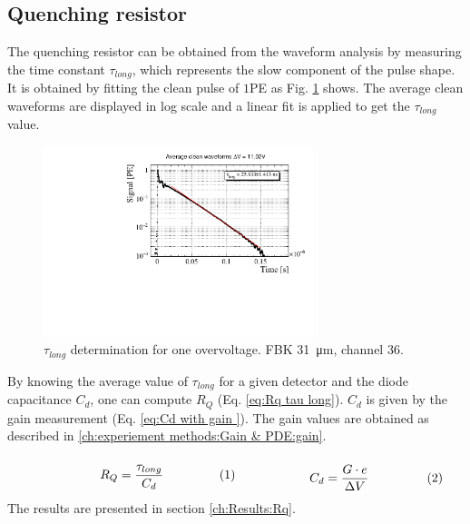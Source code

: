 \subsection{Quenching resistor} 
\label{ch:experiement methods:WA:Rq WA}
The quenching resistor can be obtained from the waveform analysis by measuring the time constant $\tau_{long}$, which represents the slow component of the pulse shape. It is obtained by fitting the clean pulse of $1$PE as Fig. \ref{fig:taulong fit} shows. The average clean waveforms are displayed in log scale and a linear fit is applied to get the $\tau_{long}$ value. 
\begin{figure}[hbtp]
    \centering
  \includegraphics[width=0.7\textwidth]{gfx/plots/WA/31/taulong.pdf}
    \caption{$\tau_{long}$ determination for one overvoltage. FBK \SI{31}{\micro m}, channel $36$.}
    \label{fig:taulong fit}
\end{figure}
By knowing the average value of $\tau_{long}$ for a given detector and the diode capacitance $C_d$, one can compute $R_Q$ (Eq. \eqref{eq:Rq tau long}). $C_d$ is given by the gain measurement (Eq. \eqref{eq:Cd with gain }). The gain values are obtained as described in \ref{ch:experiement methods:Gain & PDE:gain}. 
\begin{equation*}
  \begin{minipage}[t]{0.48\linewidth}
    \begin{equation}
      \label{eq:Rq tau long}
      R_Q = \frac{\tau_{long}}{ C_d }
    \end{equation}
  \end{minipage}
  \hfill
  \begin{minipage}[t]{0.48\linewidth}
    \begin{equation}
      \label{eq:Cd with gain }
      C_d = \frac{G\cdot e}{\Delta V}
    \end{equation}
  \end{minipage}
\end{equation*}
The results are presented in section \ref{ch:Results:Rq}.

